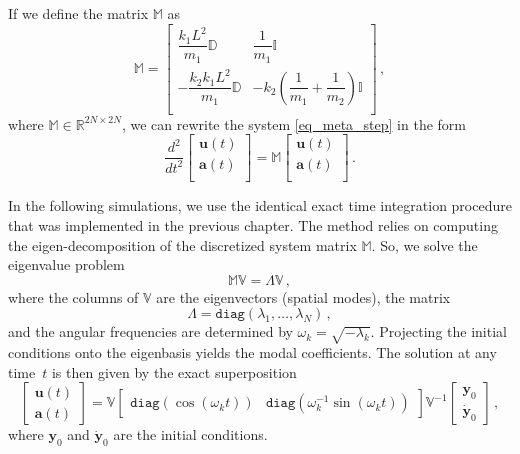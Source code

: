 \documentclass[11pt,a4paper,oneside,openright]{report} %
\begin{document}
If we define the matrix $\mathbb{M}$ as
\begin{equation}
\mathbb{M} = 
\begin{bmatrix}
    \dfrac{k_1 L^2}{m_1}\mathbb{D} & \dfrac{1}{m_1} \mathbb{I} \\
    - \dfrac{k_2 k_1 L^2}{m_1}\mathbb{D} & -k_2 \left(\dfrac{1}{m_1} + \dfrac{1}{m_2} \right) \mathbb{I}  \\
\end{bmatrix} \, ,
\end{equation}
where $\mathbb{M} \in \mathbb{R}^{2N \times 2N}$, we can rewrite the system \eqref{eq_meta_step} in the form
\begin{equation}
    \dfrac{d^2}{dt^2}
    \begin{bmatrix}
    \boldsymbol{u}(t) \\
    \boldsymbol{a}(t)  \\
    \end{bmatrix}
    = \mathbb{M} 
    \begin{bmatrix}
    \boldsymbol{u}(t) \\
    \boldsymbol{a}(t)  \\
    \end{bmatrix} \, .
\end{equation}

In the following simulations, we use the identical exact time integration procedure that was implemented in the previous chapter. The method relies on computing the eigen-decomposition of the discretized system matrix $\mathbb{M}$. So, we solve the eigenvalue problem
\begin{equation}
\mathbb{M} \mathbb{V} = \Lambda \mathbb{V} \, ,
\end{equation}
where the columns of $\mathbb{V}$ are the eigenvectors (spatial modes), the matrix
\begin{equation}
    \Lambda = \texttt{diag} \left(\lambda_1, \dots, \lambda_N \right) \, ,
\end{equation}
and the angular frequencies are determined by $\omega_k = \sqrt{-\lambda_k}$. Projecting the initial conditions onto the eigenbasis yields the modal coefficients. The solution at any time~$t$ is then given by the exact superposition
\begin{equation}
\begin{bmatrix}
\boldsymbol{u}(t) \\[5pt]
\boldsymbol{a}(t)
\end{bmatrix}
= \mathbb{V} 
\begin{bmatrix}
\texttt{diag}(\cos(\omega_k t)) & \texttt{diag}(\omega_k^{-1} \sin(\omega_k t))
\end{bmatrix}
\mathbb{V}^{-1}
\begin{bmatrix}
\boldsymbol{y}_0 \\[5pt]
\dot{\boldsymbol{y}}_0
\end{bmatrix} \, ,
\end{equation}
where $\boldsymbol{y}_0$ and $\dot{\boldsymbol{y}}_0$ are the initial conditions.
\end{document}
